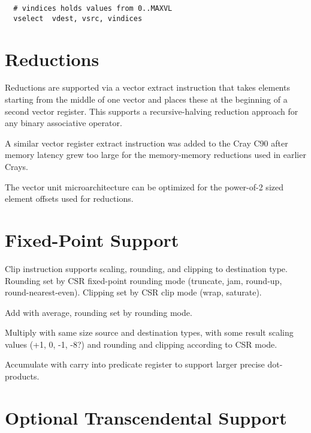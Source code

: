 \begin{verbatim}
  # vindices holds values from 0..MAXVL
  vselect  vdest, vsrc, vindices
\end{verbatim}

\section{Reductions}

Reductions are supported via a vector extract instruction that takes
elements starting from the middle of one vector and places these at
the beginning of a second vector register.  This supports a
recursive-halving reduction approach for any binary associative
operator.

\begin{commentary}
  A similar vector register extract instruction was added to the Cray
  C90 after memory latency grew too large for the memory-memory
  reductions used in earlier Crays.

  The vector unit microarchitecture can be optimized for the
  power-of-2 sized element offsets used for reductions.
\end{commentary}


\section{Fixed-Point Support}

Clip instruction supports scaling, rounding, and clipping to
destination type.  Rounding set by CSR fixed-point rounding mode
(truncate, jam, round-up, round-nearest-even).  Clipping set by CSR
clip mode (wrap, saturate).

Add with average, rounding set by rounding mode.

Multiply with same size source and destination types, with some result
scaling values (+1, 0, -1, -8?) and rounding and clipping according to
CSR mode.

Accumulate with carry into predicate register to support larger
precise dot-products.

\section{Optional Transcendental Support}

